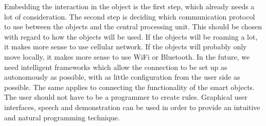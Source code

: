 Embedding the interaction in the object is the first step, which already needs a lot of consideration.
The second step is deciding which communication protocol to use between the objects and the central processing unit.
This should be chosen with regard to how the objects will be used. If the objects will be roaming a lot, it makes more sense to use cellular network.
If the objects will probably only move locally, it makes more sense to use WiFi or Bluetooth. In the future, we need intelligent frameworks which allow the connection to be set up as autonomously as possible, with as little configuration from the user side as possible.
The same applies to connecting the functionality of the smart objects.
The user should not have to be a programmer to create rules.
Graphical user interfaces, speech and demonstration can be used in order to provide an intuitive and natural programming technique.





\balancecolumns

